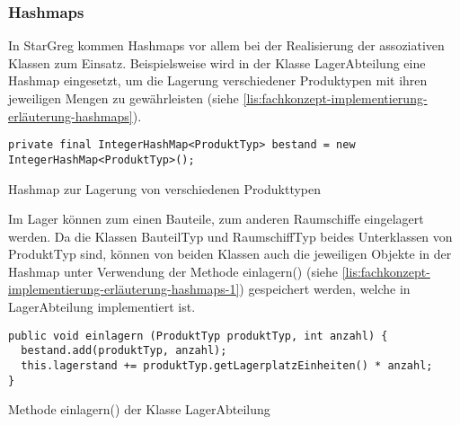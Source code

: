 \subsubsection{Hashmaps}
\label{subsub:fachkonzept-implementierung-erläuterung-hashmaps}

In StarGreg kommen Hashmaps vor allem bei der Realisierung der assoziativen Klassen zum Einsatz. Beispielsweise wird in der Klasse LagerAbteilung eine Hashmap eingesetzt, um die Lagerung verschiedener Produktypen mit ihren jeweiligen Mengen zu gewährleisten (siehe \ref{lis:fachkonzept-implementierung-erläuterung-hashmaps}).

\begin{programm}[htb]
\begin{lstlisting}[breaklines=true]
private final IntegerHashMap<ProduktTyp> bestand = new IntegerHashMap<ProduktTyp>();
\end{lstlisting}
\caption{Hashmap zur Lagerung von verschiedenen Produkttypen\label{lis:fachkonzept-implementierung-erläuterung-hashmaps}}
\end{programm}

Im Lager können zum einen Bauteile, zum anderen Raumschiffe eingelagert werden. Da die Klassen BauteilTyp und RaumschiffTyp beides Unterklassen von ProduktTyp sind, können von beiden Klassen auch die jeweiligen Objekte in der Hashmap unter Verwendung der Methode einlagern() (siehe \ref{lis:fachkonzept-implementierung-erläuterung-hashmaps-1}) gespeichert werden, welche in LagerAbteilung implementiert ist.

\begin{programm}[htb]
\begin{lstlisting}[breaklines=true]
public void einlagern (ProduktTyp produktTyp, int anzahl) {
  bestand.add(produktTyp, anzahl);
  this.lagerstand += produktTyp.getLagerplatzEinheiten() * anzahl;
}
\end{lstlisting}
\caption{Methode einlagern() der Klasse LagerAbteilung\label{lis:fachkonzept-implementierung-erläuterung-hashmaps-1}}
\end{programm}